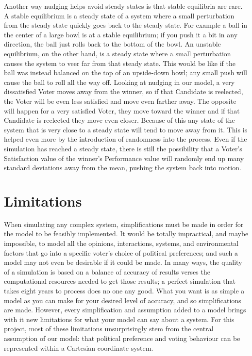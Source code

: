 \documentclass[12pt]{article}
\begin{document}
\qquad Another way nudging helps avoid steady states is that stable equilibria are rare. A stable equilibrium is a steady state of a system where a small perturbation from the steady state quickly goes back to the steady state. For example a ball in the center of a large bowl is at a stable equilibrium; if you push it a bit in any direction, the ball just rolls back to the bottom of the bowl. An unstable equilibrium, on the other hand, is a steady state where a small perturbation causes the system to veer far from that steady state. This would be like if the ball was instead balanced on the top of an upside-down bowl; any small push will cause the ball to roll all the way off. Looking at nudging in our model, a very dissatisfied Voter moves away from the winner, so if that Candidate is reelected, the Voter will be even less satisfied and move even farther away. The opposite will happen for a very satisfied Voter, they move toward the winner and if that Candidate is reelected they move even closer. Because of this any state of the system that is very close to a steady state will tend to move away from it. This is helped even more by the introduction of randomness into the process. Even if the simulation has reached a steady state, there is still the possibility that a Voter's Satisfaction value of the winner's Performance value will randomly end up many standard deviations away from the mean, pushing the system back into motion. \\

\section{Limitations} \label{Limitations}
\qquad When simulating any complex system, simplifications must be made in order for the model to be feasibly implemented. It would be totally impractical, and maybe impossible, to model all the opinions, interactions, systems, and environmental factors that go into a specific voter's choice of political preferences; and such a model may not even be desirable if it could be made. In many ways, the quality of a simulation is based on a balance of accuracy of results verses the computational resources needed to get those results; a perfect simulation that takes eight years to process does no one any good. What you want is as simple a model as you can make for your desired level of accuracy, and so simplifications are made. However, every simplification and assumption added to a model brings with it new limitations for what your model can say about a system. For this project, most of these limitations unsurprisingly stem from the central assumption of our model: that political preference and voting behaviour can be represented within a Cartesian coordinate system. \\
\end{document}
